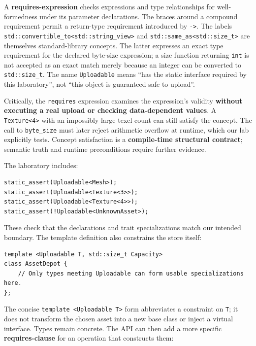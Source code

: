 A \textbf{requires-expression} checks expressions and type relationships for well-formedness under its parameter declarations. The braces around a compound requirement permit a return-type requirement introduced by \texttt{-\textgreater{}}. The labels \texttt{std::convertible\_to\textless{}std::string\_view\textgreater{}} and \texttt{std::same\_as\textless{}std::size\_t\textgreater{}} are themselves standard-library concepts. The latter expresses an exact type requirement for the declared byte-size expression; a size function returning \texttt{int} is not accepted as an exact match merely because an integer can be converted to \texttt{std::size\_t}. The name \texttt{Uploadable} means ``has the static interface required by this laboratory'', not ``this object is guaranteed safe to upload''.

Critically, the \texttt{requires} expression examines the expression's validity \textbf{without executing a real upload or checking data-dependent values}. A \texttt{Texture\textless{}4\textgreater{}} with an impossibly large texel count can still satisfy the concept. The call to \texttt{byte\_size} must later reject arithmetic overflow at runtime, which our lab explicitly tests. Concept satisfaction is a \textbf{compile-time structural contract}; semantic truth and runtime preconditions require further evidence.

The laboratory includes:

\begin{verbatim}
static_assert(Uploadable<Mesh>);
static_assert(Uploadable<Texture<3>>);
static_assert(Uploadable<Texture<4>>);
static_assert(!Uploadable<UnknownAsset>);
\end{verbatim}

These check that the declarations and trait specializations match our intended boundary. The template definition also constrains the store itself:

\begin{verbatim}
template <Uploadable T, std::size_t Capacity>
class AssetDepot {
    // Only types meeting Uploadable can form usable specializations here.
};
\end{verbatim}

The concise \texttt{template\ \textless{}Uploadable\ T\textgreater{}} form abbreviates a constraint on \texttt{T}; it does not transform the chosen asset into a new base class or inject a virtual interface. Types remain concrete. The API can then add a more specific \textbf{requires-clause} for an operation that constructs them:

